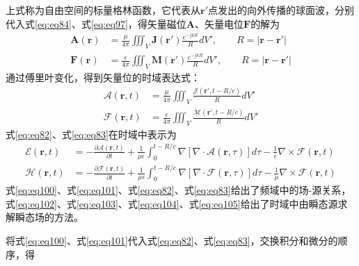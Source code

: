 \documentclass{article}
\numberwithin{equation}{section}
\renewcommand{\vec}[1]{\boldsymbol{#1}}
\begin{document}
上式称为自由空间的标量格林函数，它代表从$\vec{r}'$点发出的向外传播的球面波，分别代入式\ref{eq:eq84}、式\ref{eq:eq97}，得矢量磁位$\mathbf{A}$、矢量电位$\mathbf{F}$的解为
\begin{align}
    \label{eq:eq100}
    \mathbf{A}(\vec{r})&=\frac{\mu}{4\pi}\iiint_V\mathbf{J}(\vec{r}')\frac{e^{-jkR}}{R}dV',\qquad R=|\vec{r}-\vec{r}'| \\
    \label{eq:eq101}
    \mathbf{F}(\vec{r})&=\frac{\epsilon}{4\pi}\iiint_V\mathbf{M}(\vec{r}')\frac{e^{-jkR}}{R}dV',\qquad R=|\vec{r}-\vec{r}'|
\end{align}
通过傅里叶变化，得到矢量位的时域表达式：
\begin{align}
    \label{eq:eq102}
    \vec{\mathcal{A}}(\vec{r},t)&=\frac{\mu}{4\pi}\iiint_V\frac{\vec{\mathcal{J}}(\vec{r}',t-R/c)}{R}dV' \\
    \label{eq:eq103}
    \vec{\mathcal{F}}(\vec{r},t)&=\frac{\epsilon}{4\pi}\iiint_V\frac{\vec{\mathcal{M}}(\vec{r}',t-R/c)}{R}dV'
\end{align}
式\ref{eq:eq82}、式\ref{eq:eq83}在时域中表示为
\begin{align}
    \label{eq:eq104}
    \vec{\mathcal{E}}(\vec{r},t)&=-\frac{\partial \vec{\mathcal{A}}(\vec{r},t)}{\partial t}+\frac{1}{\mu\epsilon}\int^{t-R/c}_0\nabla[\nabla\cdot\vec{\mathcal{A}}(\vec{r},\tau)]d\tau-\frac{1}{\epsilon}\nabla\times\vec{\mathcal{F}}(\vec{r},t) \\
    \label{eq:eq105}
    \vec{\mathcal{H}}(\vec{r},t)&=-\frac{\partial \vec{\mathcal{F}}(\vec{r},t)}{\partial t}+\frac{1}{\mu\epsilon}\int^{t-R/c}_0\nabla[\nabla\cdot\vec{\mathcal{F}}(\vec{r},\tau)]d\tau-\frac{1}{\mu}\nabla\times\vec{\mathcal{F}}(\vec{r},t)
\end{align}
式\ref{eq:eq100}、式\ref{eq:eq101}、式\ref{eq:eq82}、式\ref{eq:eq83}给出了频域中的场-源关系，式\ref{eq:eq102}、式\ref{eq:eq103}、式\ref{eq:eq104}、式\ref{eq:eq105}给出了时域中由瞬态源求解瞬态场的方法。
\par
将式\ref{eq:eq100}、式\ref{eq:eq101}代入式\ref{eq:eq82}、式\ref{eq:eq83}，交换积分和微分的顺序，得
\end{document}
